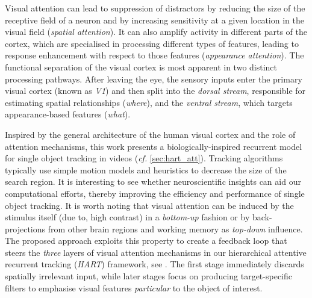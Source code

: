 	Visual attention can lead to suppression of distractors by reducing the size of the receptive field of a neuron and by increasing sensitivity at a given location in the visual field (\emph{spatial attention}). It can also amplify activity in different parts of the cortex, which are
	specialised in processing different types of features, leading to  response enhancement with respect to those features (\emph{appearance attention}).
	The functional separation of the visual cortex is most apparent in two distinct processing pathways. After leaving the eye, the sensory inputs enter the primary visual cortex (known as \emph{V1}) and then split into the \emph{dorsal stream}, responsible for estimating spatial relationships (\emph{where}), and the \emph{ventral stream}, which targets appearance-based features (\emph{what}).

    Inspired by the general architecture of the human visual cortex and the role of attention mechanisms, this work presents a biologically-inspired recurrent model for single object tracking in videos (\emph{cf.} \cref{sec:hart_att}). Tracking algorithms typically use simple motion models and heuristics to decrease the size of the search region. It is interesting to see whether neuroscientific insights can aid our computational efforts, thereby improving the efficiency and performance of single object tracking.
	It is worth noting that visual attention can be induced by the stimulus itself (due to, \eg high contrast) in a \emph{bottom-up} fashion or by back-projections from other brain regions and working memory as \emph{top-down} influence. The proposed approach exploits this property to create a feedback loop that steers the \emph{three} layers of visual attention mechanisms in our hierarchical attentive recurrent tracking (\emph{HART}) framework, see . The first stage immediately discards spatially irrelevant input, while later stages focus on producing target-specific filters to emphasise visual features \emph{particular} to the object of interest.
	
